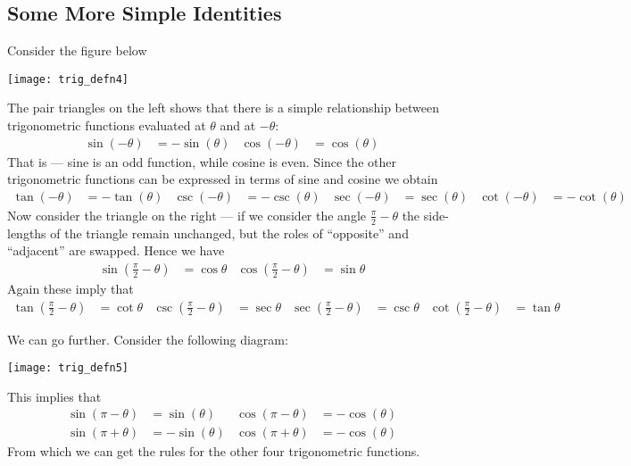\subsection{Some More Simple Identities}\label{ssec_B_2_4}
Consider the figure below
\begin{center}
 \texttt{[image: trig\_defn4]}
\end{center}
The pair triangles on the left shows that there is a simple relationship between
trigonometric functions evaluated at $\theta$ and at $-\theta$:
\begin{align*}
  \sin(-\theta)&=-\sin(\theta) & \cos(-\theta) &=\cos(\theta)
\end{align*}
That is --- sine is an odd function, while cosine is even. Since the other trigonometric
functions can be expressed in terms of sine and cosine we obtain
\begin{align*}
  \tan(-\theta) &=-\tan(\theta) &
  \csc(-\theta) &=-\csc(\theta) &
  \sec(-\theta) &=\sec(\theta) &
  \cot(-\theta) &=-\cot(\theta)
\end{align*}
Now consider the triangle on the right --- if we consider the angle
$\frac{\pi}{2}-\theta$ the side-lengths of the triangle remain unchanged, but the roles
of ``opposite'' and ``adjacent'' are swapped. Hence we have
\begin{align*}
\sin\left(\tfrac{\pi}{2}-\theta\right)&=\cos\theta &
\cos\left(\tfrac{\pi}{2}-\theta\right)&=\sin\theta
\end{align*}
Again these imply that
\begin{align*}
\tan\left(\tfrac{\pi}{2}-\theta\right)&=\cot\theta &
\csc\left(\tfrac{\pi}{2}-\theta\right)&=\sec\theta &
\sec\left(\tfrac{\pi}{2}-\theta\right)&=\csc\theta &
\cot\left(\tfrac{\pi}{2}-\theta\right)&=\tan\theta
\end{align*}

We can go further. Consider the following diagram:
\begin{center}
 \texttt{[image: trig\_defn5]}
\end{center}
This implies that
\begin{align*}
  \sin(\pi-\theta)&=\sin(\theta) & \cos(\pi-\theta) &= -\cos(\theta) \\
  \sin(\pi+\theta)&=-\sin(\theta) & \cos(\pi+\theta) &=-\cos(\theta)
\end{align*}
From which we can get the rules for the other four trigonometric functions.


